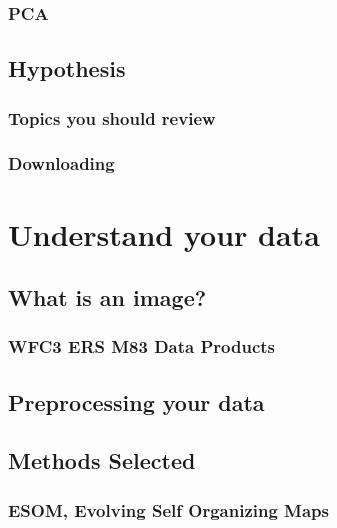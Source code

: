 \documentclass[11pt,fleqn]{book} %
\begin{document}
\subsection{PCA}



\section{Hypothesis}


\subsection{Topics you should review}

\subsection{Downloading}



\chapter{Understand your data}

\section{What is an image?}
	
        
	\subsection{WFC3 ERS M83 Data Products}
  
\section{Preprocessing your data}


\section{Methods Selected}

\subsection{ESOM, Evolving Self Organizing Maps}
\end{document}
